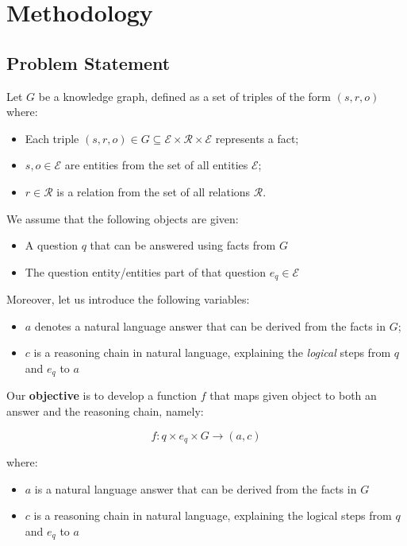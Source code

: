 \documentclass[pdflatex,sn-mathphys-num]{sn-jnl}%
\theoremstyle{thmstyleone}%
\theoremstyle{thmstyletwo}%
\theoremstyle{thmstylethree}%
\begin{document}
\section{Methodology}
\label{sec:methodology}

\subsection{Problem Statement}
\label{sec:formal_problem}
Let $G$ be a knowledge graph, defined as a set of triples of the form $(s, r, o)$ where:
\begin{itemize}
    \item Each triple $(s, r, o) \in G \subseteq \mathcal{E} \times \mathcal{R} \times \mathcal{E}$ represents a fact;
    \item $s, o \in \mathcal{E}$ are entities from the set of all entities $\mathcal{E}$;
    \item $r \in \mathcal{R}$ is a relation from the set of all relations $\mathcal{R}$.
\end{itemize}
We assume that the following objects are given:
\begin{itemize}
    \item A question $q$ that can be answered using facts from $G$
    \item The question entity/entities part of that question $e_q \in \mathcal{E}$
\end{itemize}
Moreover, let us introduce the following variables:
\begin{itemize}
    \item $a$ denotes a natural language answer that can be derived from the facts in $G$;
    \item $c$ is a reasoning chain in natural language, explaining the \textit{logical} steps from $q$ and $e_q$ to $a$
\end{itemize}

\vspace{4mm}

Our \textbf{objective} is to develop a function $f$ that maps given object to both an answer and the reasoning chain, namely:

\[f: q \times e_q \times G \rightarrow (a, c)\]

where:
\begin{itemize}
    \item $a$ is a natural language answer that can be derived from the facts in $G$
    \item $c$ is a reasoning chain in natural language, explaining the logical steps from $q$ and $e_q$ to $a$
\end{itemize}
\end{document}
